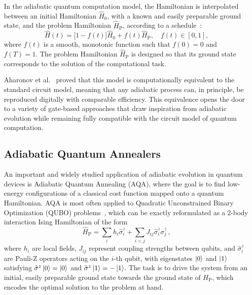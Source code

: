 In the adiabatic quantum computation model, the Hamiltonian is interpolated between an initial Hamiltonian $\hat{H}_0$, with a known and easily preparable ground state, and the problem Hamiltonian $\hat{H}_\mathrm{P}$, according to a schedule~\cite{albash_adiabatic_2018}:
\begin{equation}
    \hat{H}(t) = \big[1 - f(t)\big] \hat{H}_0 + f(t) \hat{H}_\mathrm{P}, \quad f(t) \in [0,1],
    \label{eq:adiabatic_passage}
\end{equation}
where $f(t)$ is a smooth, monotonic function such that $f(0)=0$ and $f(T)=1$. The problem Hamiltonian $\hat{H}_\mathrm{P}$ is designed so that its ground state corresponds to the solution of the computational task.

Aharonov et al.~\cite{aharonov_adiabatic_2004} proved that this model is computationally equivalent to the standard circuit model, meaning that any adiabatic process can, in principle, be reproduced digitally with comparable efficiency. This equivalence opens the door to a variety of gate-based approaches that draw inspiration from adiabatic evolution while remaining fully compatible with the circuit model of quantum computation.

\subsection{Adiabatic Quantum Annealers}
An important and widely studied application of adiabatic evolution in quantum devices is Adiabatic Quantum Annealing (AQA), where the goal is to find low-energy configurations of a classical cost function mapped onto a quantum Hamiltonian. AQA is most often applied to Quadratic Unconstrained Binary Optimization (QUBO) problems~\cite{kadowaki_quantum_1998}, which can be exactly reformulated as a 2-body interaction Ising Hamiltonian of the form~\cite{albash_adiabatic_2018}
\begin{equation}
    \hat{H}_\mathrm{P} = \sum_i h_i \hat{\sigma}_i^z + \sum_{i<j} J_{ij} \hat{\sigma}_i^z \hat{\sigma}_j^z\,,
    \label{eq:ising_hamiltonian}
\end{equation}
where $h_i$ are local fields, $J_{ij}$ represent coupling strengths between qubits, and $\hat{\sigma}_i^z$ are Pauli-Z operators acting on the $i$-th qubit, with eigenstates $\ket{0}$ and $\ket{1}$ satisfying $\hat{\sigma}^z \ket{0} = \ket{0}$ and $\hat{\sigma}^z \ket{1} = -\ket{1}$. The task is to drive the system from an initial, easily preparable ground state towards the ground state of $H_\mathrm{P}$, which encodes the optimal solution to the problem at hand.

